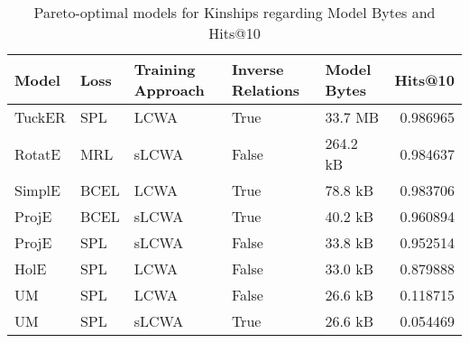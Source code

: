 \begin{table}
\centering
\caption{Pareto-optimal models for Kinships regarding Model Bytes and Hits@10}
\begin{tabular}{lllllr}
\toprule
  Model &  Loss & Training Approach & Inverse Relations & Model Bytes &   Hits@10 \\
\midrule
 TuckER &   SPL &              LCWA &              True &     33.7 MB &  0.986965 \\
 RotatE &   MRL &             sLCWA &             False &    264.2 kB &  0.984637 \\
 SimplE &  BCEL &              LCWA &              True &     78.8 kB &  0.983706 \\
  ProjE &  BCEL &             sLCWA &              True &     40.2 kB &  0.960894 \\
  ProjE &   SPL &             sLCWA &             False &     33.8 kB &  0.952514 \\
   HolE &   SPL &              LCWA &             False &     33.0 kB &  0.879888 \\
     UM &   SPL &              LCWA &             False &     26.6 kB &  0.118715 \\
     UM &   SPL &             sLCWA &              True &     26.6 kB &  0.054469 \\
\bottomrule
\end{tabular}
\end{table}

